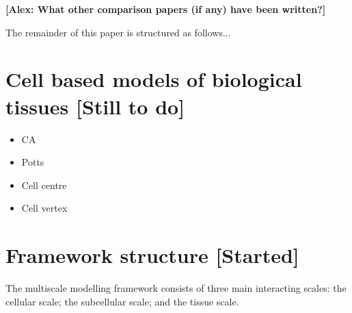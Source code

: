 \documentclass[a4paper,12pt]{article}
\newcommand{\todo}{[Started]}
\newcommand{\tostart}{[Still to do]}
\newcommand{\authornote}[2]{{\bf [#1: #2]}}
\newcommand{\alex}[1]{\authornote{Alex}{#1}}
\begin{document}
\alex{What other comparison papers (if any) have been written?}

The remainder of this paper is structured as follows...

\section{Cell based models of biological tissues \tostart} \label{sec:cell_level_models}

\begin{itemize}
  \item CA
  \item Potts
  \item Cell centre
  \item Cell vertex
\end{itemize}

\section{Framework structure \todo} \label{sec:computational_framework}

The multiscale modelling framework consists of three main interacting scales: the cellular scale; 
the subcellular scale; and the tissue scale.
\end{document}
